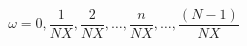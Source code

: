 \documentclass[../main.tex]{subfiles}%
\begin{document}
%
    \Xequation%
    \begin{equation}%
        \omega = 0,%
        \dfrac{1}{NX},%
        \dfrac{2}{NX},%
        \ldots,%
        \dfrac{n}{NX},%
        \ldots,%
        \dfrac{(N-1)}{NX}%
        \label{eq:fourier-sampling-frequency}%
    \end{equation}%
\end{document}
